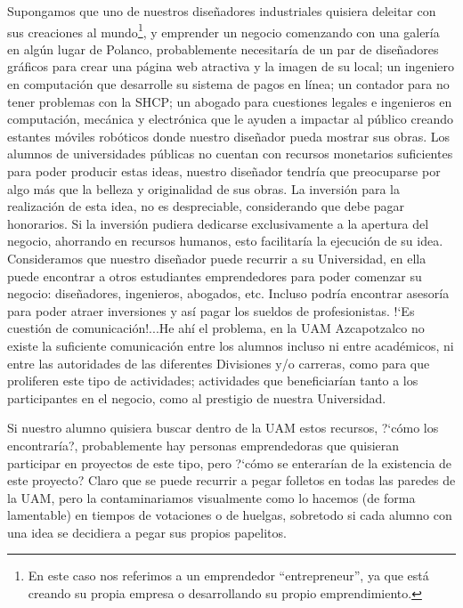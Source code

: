 \documentclass[11pt,letterpaper,titlepage]{article}
\begin{document}
Supongamos que uno de nuestros dise\~nadores industriales quisiera deleitar con sus creaciones al mundo\footnote{En este caso nos referimos a un emprendedor ``entrepreneur'', ya que est\'a creando su propia empresa o desarrollando su propio emprendimiento.\cite{emprendedurismo}}, y emprender un negocio comenzando con una galer\'ia en alg\'un lugar de Polanco, probablemente necesitar\'ia de un par de dise\~nadores gr\'aficos para crear una p\'agina web atractiva y la imagen de su local; un ingeniero en computaci\'on que desarrolle su sistema de pagos en l\'inea; un contador para no tener problemas con la SHCP; un abogado para cuestiones legales e ingenieros en computaci\'on, mec\'anica y electr\'onica que le ayuden a impactar al p\'ublico creando estantes m\'oviles rob\'oticos donde nuestro dise\~nador pueda mostrar sus obras. Los alumnos de universidades p\'ublicas no cuentan con recursos monetarios suficientes para poder producir estas ideas, nuestro dise\~nador tendr\'ia que preocuparse por algo m\'as que la belleza y originalidad de sus obras. La inversi\'on para la realizaci\'on de esta idea, no es despreciable, considerando que debe pagar honorarios. Si la inversi\'on pudiera dedicarse exclusivamente a la apertura del negocio, ahorrando en recursos humanos, esto facilitar\'ia la ejecuci\'on de su idea. Consideramos que nuestro dise\~nador puede recurrir a su Universidad, en ella puede encontrar a otros estudiantes emprendedores para poder comenzar su negocio: dise\~nadores, ingenieros, abogados, etc. Incluso podr\'ia encontrar asesor\'ia para poder atraer inversiones y as\'i pagar los sueldos de profesionistas. !`Es cuesti\'on de comunicaci\'on!...He ah\'i el problema, en la UAM Azcapotzalco no existe la suficiente comunicaci\'on \-entre los alumnos incluso ni entre acad\'emicos, ni entre las autoridades de las diferentes Divisiones y/o carreras\-, como para que proliferen este tipo de actividades; actividades que beneficiar\'ian tanto a los participantes en el negocio, como al prestigio de nuestra Universidad.

Si nuestro alumno quisiera buscar dentro de la UAM estos recursos, ?`c\'omo los encontrar\'ia?, probablemente hay personas emprendedoras que quisieran participar en proyectos de este tipo, pero ?`c\'omo se enterar\'ian de la existencia de este proyecto? Claro que se puede recurrir a pegar folletos en todas las paredes de la UAM, pero la contaminariamos visualmente como lo hacemos (de forma lamentable) en tiempos de votaciones o de huelgas, sobretodo si cada alumno con una idea se decidiera a pegar sus propios papelitos.
\end{document}
